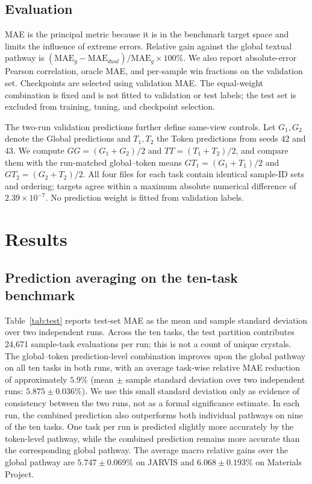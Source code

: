 \documentclass[a4paper,fleqn]{cas-sc}
\begin{document}
\subsection{Evaluation}\label{sec:evaluation}
MAE is the principal metric because it is in the benchmark target space and limits the influence of extreme errors. Relative gain against the global textual pathway is $(\mathrm{MAE}_g-\mathrm{MAE}_{dual})/\mathrm{MAE}_g\times100\%$. We also report absolute-error Pearson correlation, oracle MAE, and per-sample win fractions on the validation set. Checkpoints are selected using validation MAE. The equal-weight combination is fixed and is not fitted to validation or test labels; the test set is excluded from training, tuning, and checkpoint selection.

The two-run validation predictions further define same-view controls. Let $G_1,G_2$ denote the Global predictions and $T_1,T_2$ the Token predictions from seeds 42 and 43. We compute $GG=(G_1+G_2)/2$ and $TT=(T_1+T_2)/2$, and compare them with the run-matched global--token means $GT_1=(G_1+T_1)/2$ and $GT_2=(G_2+T_2)/2$. All four files for each task contain identical sample-ID sets and ordering; targets agree within a maximum absolute numerical difference of $2.39\times10^{-7}$. No prediction weight is fitted from validation labels.

\FloatBarrier
\section{Results}
\subsection{Prediction averaging on the ten-task benchmark}\label{sec:main}


Table~\ref{tab:test} reports test-set MAE as the mean and sample standard deviation over two independent runs. Across the ten tasks, the test partition contributes 24,671 sample-task evaluations per run; this is not a count of unique crystals. The global--token prediction-level combination improves upon the global pathway on all ten tasks in both runs, with an average task-wise relative MAE reduction of approximately $5.9\%$ (mean $\pm$ sample standard deviation over two independent runs: $5.875\pm0.036\%$). We use this small standard deviation only as evidence of consistency between the two runs, not as a formal significance estimate. In each run, the combined prediction also outperforms both individual pathways on nine of the ten tasks. One task per run is predicted slightly more accurately by the token-level pathway, while the combined prediction remains more accurate than the corresponding global pathway. The average macro relative gains over the global pathway are $5.747\pm0.069\%$ on JARVIS and $6.068\pm0.193\%$ on Materials Project.
\end{document}
